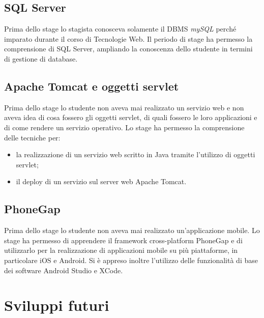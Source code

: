 \subsection{SQL Server}

Prima dello stage lo stagista conosceva solamente il DBMS \textit{mySQL} perché imparato durante il corso di Tecnologie Web. Il periodo di stage ha permesso la comprensione di SQL Server, ampliando la conoscenza dello studente in termini di gestione di database.

\subsection{Apache Tomcat e oggetti servlet}

Prima dello stage lo studente non aveva mai realizzato un servizio web e non aveva idea di cosa fossero gli oggetti servlet, di quali fossero le loro applicazioni e di come rendere un servizio operativo. Lo stage ha permesso la comprensione delle tecniche per:
\begin{itemize}
	\item la realizzazione di un servizio web scritto in Java tramite l'utilizzo di oggetti servlet;
	\item il deploy di un servizio sul server web Apache Tomcat.
\end{itemize}

\subsection{PhoneGap}

Prima dello stage lo studente non aveva mai realizzato un'applicazione mobile. Lo stage ha permesso di apprendere il framework cross-platform PhoneGap e di utilizzarlo per la realizzazione di applicazioni mobile su più piattaforme, in particolare iOS e Android. Si è appreso inoltre l'utilizzo delle funzionalità di base dei software Android Studio e XCode.

\section{Sviluppi futuri}

